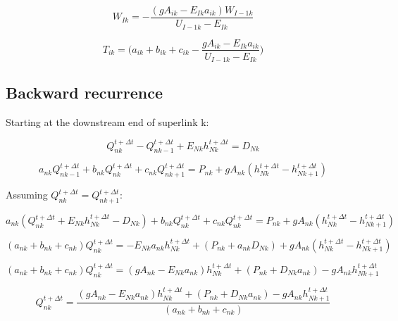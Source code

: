\documentclass[11pt]{article}
\begin{document}
\begin{equation}
  \boxed{
    W_{Ik} = - \frac{(g A_{ik} - E_{Ik} a_{ik}) W_{I - 1k} }{U_{I - 1k} - E_{Ik}}
 }
\end{equation}

\begin{equation}
  \boxed{
 T_{ik} = \biggl(a_{ik} + b_{ik} + c_{ik} - \frac{ g A_{ik} - E_{Ik} a_{ik} }{U_{I-1k} - E_{Ik}} \biggr) 
 }
\end{equation}

\clearpage

\subsection{Backward recurrence}

Starting at the downstream end of superlink k:

\begin{equation}
  Q_{nk}^{t + \Delta t} - Q_{nk - 1}^{t + \Delta t} + E_{Nk} h_{Nk}^{t + \Delta t} = D_{Nk}
\end{equation}


\begin{equation}
   a_{nk} Q_{nk - 1}^{t + \Delta t} + b_{nk} Q_{nk}^{t + \Delta t} + c_{nk} Q_{nk + 1}^{t + \Delta t} = P_{nk} + g A_{nk} (h_{Nk}^{t + \Delta t} - h_{Nk+1}^{t + \Delta t})
\end{equation}

Assuming $Q_{nk}^{t + \Delta t} = Q_{nk+1}^{t + \Delta t}$:

\begin{equation}
  a_{nk} (Q_{nk}^{t + \Delta t} + E_{Nk} h_{Nk}^{t + \Delta t} - D_{Nk}) + b_{nk} Q_{nk}^{t + \Delta t} + c_{nk} Q_{nk}^{t + \Delta t} = P_{nk} + g A_{nk} (h_{Nk}^{t + \Delta t} - h_{Nk + 1}^{t + \Delta t})
\end{equation}

\begin{equation}
  (a_{nk} + b_{nk} + c_{nk}) Q_{nk}^{t + \Delta t} = - E_{Nk} a_{nk} h_{Nk}^{t + \Delta t} + (P_{nk} + a_{nk} D_{Nk}) + g A_{nk} (h_{Nk}^{t + \Delta t} - h_{Nk + 1}^{t + \Delta t})
\end{equation}

\begin{equation}
  (a_{nk} + b_{nk} + c_{nk}) Q_{nk}^{t + \Delta t} = ( g A_{nk} - E_{Nk} a_{nk} ) h_{Nk}^{t + \Delta t} + (P_{nk} +  D_{Nk} a_{nk}) - g A_{nk} h_{Nk + 1}^{t + \Delta t}
\end{equation}


\begin{equation}
  Q_{nk}^{t + \Delta t} = \frac{( g A_{nk} -  E_{Nk} a_{nk} ) h_{Nk}^{t + \Delta t} + (P_{nk} +  D_{Nk} a_{nk}) - g A_{nk} h_{Nk + 1}^{t + \Delta t}}{(a_{nk} + b_{nk} + c_{nk})}
\end{equation}
\end{document}
